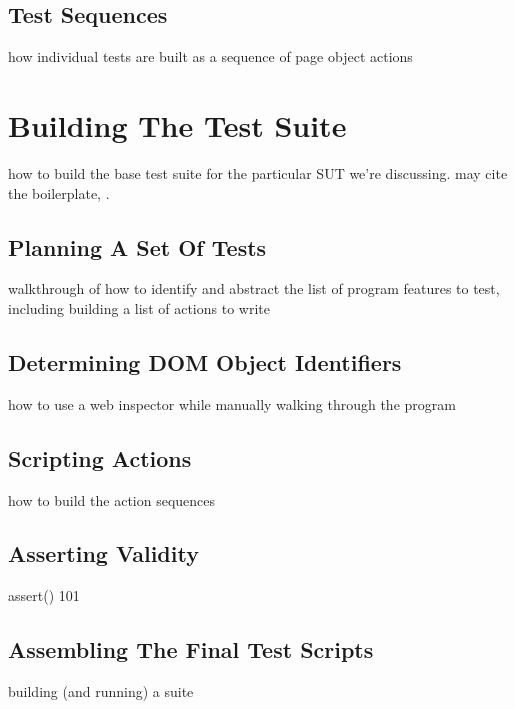 \subsection{Test Sequences}
how individual tests are built as a sequence of page object actions \citep{leotta2013capture}

\section{Building The Test Suite}
how to build the base test suite for the particular SUT we're discussing. may cite the boilerplate, \citep{GitHubma29}.

\subsection{Planning A Set Of Tests}
walkthrough of how to identify and abstract the list of program features to test, including building a list of actions to write \citep{nguyen2001testing}

\subsection{Determining DOM Object Identifiers}
how to use a web inspector while manually walking through the program

\subsection{Scripting Actions}
how to build the action sequences

\subsection{Asserting Validity}
assert() 101

\subsection{Assembling The Final Test Scripts}
building (and running) a suite
